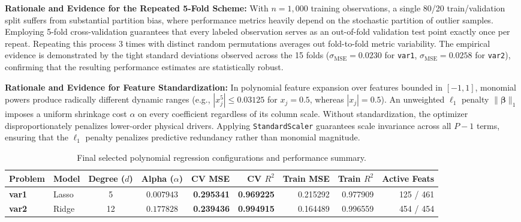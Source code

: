 \documentclass[10pt,a4paper]{article}
\begin{document}
\textbf{Rationale and Evidence for the Repeated 5-Fold Scheme:} With $n = 1{,}000$ training observations, a single 80/20 train/validation split suffers from substantial partition bias, where performance metrics heavily depend on the stochastic partition of outlier samples. Employing 5-fold cross-validation guarantees that every labeled observation serves as an out-of-fold validation test point exactly once per repeat. Repeating this process 3 times with distinct random permutations averages out fold-to-fold metric variability. The empirical evidence is demonstrated by the tight standard deviations observed across the 15 folds ($\sigma_{\text{MSE}} = 0.0230$ for \texttt{var1}, $\sigma_{\text{MSE}} = 0.0258$ for \texttt{var2}), confirming that the resulting performance estimates are statistically robust.

\textbf{Rationale and Evidence for Feature Standardization:} In polynomial feature expansion over features bounded in $[-1, 1]$, monomial powers produce radically different dynamic ranges (e.g., $|x_j^5| \le 0.03125$ for $x_j = 0.5$, whereas $|x_j| = 0.5$). An unweighted $\ell_1$ penalty $\|\boldsymbol{\beta}\|_1$ imposes a uniform shrinkage cost $\alpha$ on every coefficient regardless of its column scale. Without standardization, the optimizer disproportionately penalizes lower-order physical drivers. Applying \texttt{StandardScaler} guarantees scale invariance across all $P-1$ terms, ensuring that the $\ell_1$ penalty penalizes predictive redundancy rather than monomial magnitude.

\begin{table}[ht]
\centering
\small
\begin{tabular}{llccrrrrr}
\toprule
\textbf{Problem} & \textbf{Model} & \textbf{Degree ($d$)} & \textbf{Alpha ($\alpha$)} & \textbf{CV MSE} & \textbf{CV $R^2$} & \textbf{Train MSE} & \textbf{Train $R^2$} & \textbf{Active Feats} \\
\midrule
\textbf{var1} & Lasso & 5 & $0.007943$ & \textbf{0.295341} & \textbf{0.969225} & 0.215292 & 0.977909 & 125 / 461 \\
\textbf{var2} & Ridge & 12 & $0.177828$ & \textbf{0.239436} & \textbf{0.994915} & 0.164489 & 0.996559 & 454 / 454 \\
\bottomrule
\end{tabular}
\caption{Final selected polynomial regression configurations and performance summary.}
\label{tab:final_summary}
\end{table}

\vspace{-0.5em}
\end{document}
